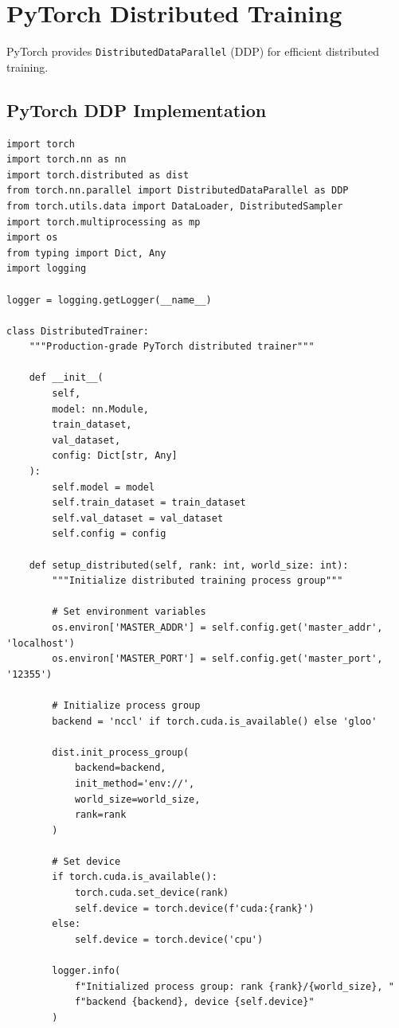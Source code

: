 \section{PyTorch Distributed Training}

PyTorch provides \texttt{DistributedDataParallel} (DDP) for efficient distributed training.

\subsection{PyTorch DDP Implementation}

\begin{lstlisting}[style=python, caption=Complete PyTorch Distributed Training Example]
import torch
import torch.nn as nn
import torch.distributed as dist
from torch.nn.parallel import DistributedDataParallel as DDP
from torch.utils.data import DataLoader, DistributedSampler
import torch.multiprocessing as mp
import os
from typing import Dict, Any
import logging

logger = logging.getLogger(__name__)

class DistributedTrainer:
    """Production-grade PyTorch distributed trainer"""

    def __init__(
        self,
        model: nn.Module,
        train_dataset,
        val_dataset,
        config: Dict[str, Any]
    ):
        self.model = model
        self.train_dataset = train_dataset
        self.val_dataset = val_dataset
        self.config = config

    def setup_distributed(self, rank: int, world_size: int):
        """Initialize distributed training process group"""

        # Set environment variables
        os.environ['MASTER_ADDR'] = self.config.get('master_addr', 'localhost')
        os.environ['MASTER_PORT'] = self.config.get('master_port', '12355')

        # Initialize process group
        backend = 'nccl' if torch.cuda.is_available() else 'gloo'

        dist.init_process_group(
            backend=backend,
            init_method='env://',
            world_size=world_size,
            rank=rank
        )

        # Set device
        if torch.cuda.is_available():
            torch.cuda.set_device(rank)
            self.device = torch.device(f'cuda:{rank}')
        else:
            self.device = torch.device('cpu')

        logger.info(
            f"Initialized process group: rank {rank}/{world_size}, "
            f"backend {backend}, device {self.device}"
        )


\end{lstlisting}
